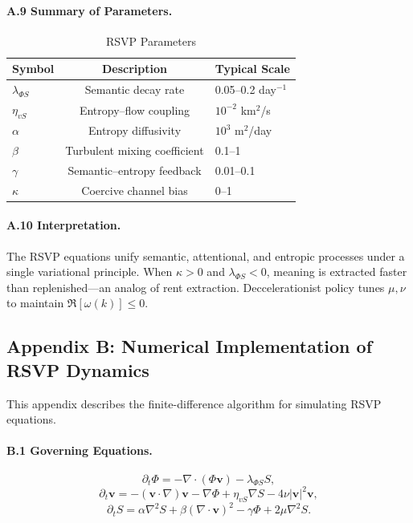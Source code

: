 \documentclass[12pt]{article}
\begin{document}
\paragraph{A.9 Summary of Parameters.}

\begin{table}[h]
\caption{RSVP Parameters}
\begin{center}
\begin{tabular}{lcl}
\toprule
Symbol & Description & Typical Scale \\
\midrule
\(\lambda_{\Phi S}\) & Semantic decay rate & 0.05–0.2 day\(^{-1}\) \\
\(\eta_{vS}\) & Entropy–flow coupling & \(10^{-2}\) km\(^2\)/s \\
\(\alpha\) & Entropy diffusivity & \(10^3\) m\(^2\)/day \\
\(\beta\) & Turbulent mixing coefficient & 0.1–1 \\
\(\gamma\) & Semantic–entropy feedback & 0.01–0.1 \\
\(\kappa\) & Coercive channel bias & 0–1 \\
\bottomrule
\end{tabular}
\end{center}
\end{table}

\paragraph{A.10 Interpretation.}

The RSVP equations unify semantic, attentional, and entropic processes under a single variational principle. When \(\kappa > 0\) and \(\lambda_{\Phi S} < 0\), meaning is extracted faster than replenished—an analog of rent extraction. Deccelerationist policy tunes \(\mu, \nu\) to maintain \(\Re[\omega(k)] \leq 0\).

\subsection*{Appendix B: Numerical Implementation of RSVP Dynamics}

This appendix describes the finite-difference algorithm for simulating RSVP equations.

\paragraph{B.1 Governing Equations.}

\[
\partial_t \Phi = -\nabla \cdot (\Phi \mathbf{v}) - \lambda_{\Phi S} S,
\]
\[
\partial_t \mathbf{v} = -(\mathbf{v} \cdot \nabla) \mathbf{v} - \nabla \Phi + \eta_{vS} \nabla S - 4 \nu |\mathbf{v}|^2 \mathbf{v},
\]
\[
\partial_t S = \alpha \nabla^2 S + \beta (\nabla \cdot \mathbf{v})^2 - \gamma \Phi + 2 \mu \nabla^2 S.
\]
\end{document}
